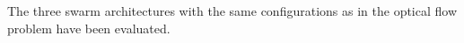 


\noindent The three swarm architectures with the same configurations as
in the optical flow problem have been evaluated.
%
